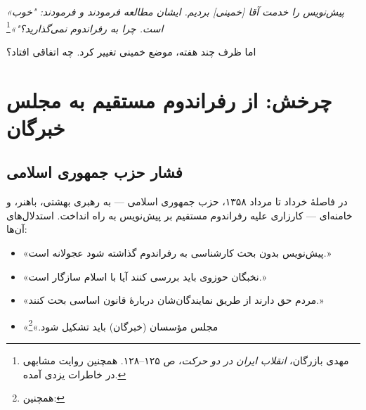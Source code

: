 \begin{warningBox}
\textit{«پیش‌نویس را خدمت آقا [خمینی] بردیم. ایشان مطالعه فرمودند و فرمودند: "خوب است. چرا به رفراندوم نمی‌گذارید؟"»}\footnote{مهدی بازرگان، \textit{انقلاب ایران در دو حرکت}، ص ۱۲۵–۱۲۸. همچنین روایت مشابهی در خاطرات یزدی آمده.}
\end{warningBox}

اما ظرف چند هفته، موضع خمینی تغییر کرد. چه اتفاقی افتاد؟

\section{چرخش: از رفراندوم مستقیم به مجلس خبرگان}

\subsection{فشار حزب جمهوری اسلامی}

در فاصلهٔ خرداد تا مرداد ۱۳۵۸، حزب جمهوری اسلامی — به رهبری بهشتی، باهنر، و خامنه‌ای — کارزاری علیه رفراندوم مستقیم بر پیش‌نویس به راه انداخت. استدلال‌های آن‌ها:

\begin{itemize}[label=\textcolor{cAccent}{$\blacktriangleright$}, rightmargin=2em]
    \item «پیش‌نویس بدون بحث کارشناسی به رفراندوم گذاشته شود عجولانه است.»
    \item «نخبگان حوزوی باید بررسی کنند آیا با اسلام سازگار است.»
    \item «مردم حق دارند از طریق نمایندگان‌شان دربارهٔ قانون اساسی بحث کنند.»
    \item «مجلس مؤسسان (خبرگان) باید تشکیل شود.»\footnote{ همچنین: }
\end{itemize}

